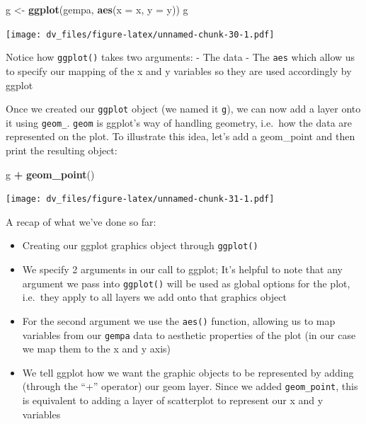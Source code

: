 \documentclass[]{article}
\newenvironment{Shaded}{\begin{snugshade}}{\end{snugshade}}
\newcommand{\DataTypeTok}[1]{\textcolor[rgb]{0.13,0.29,0.53}{#1}}
\newcommand{\KeywordTok}[1]{\textcolor[rgb]{0.13,0.29,0.53}{\textbf{#1}}}
\newcommand{\NormalTok}[1]{#1}
\newcommand{\OperatorTok}[1]{\textcolor[rgb]{0.81,0.36,0.00}{\textbf{#1}}}
\newcommand{\StringTok}[1]{\textcolor[rgb]{0.31,0.60,0.02}{#1}}
\providecommand{\tightlist}{%
  \setlength{\itemsep}{0pt}\setlength{\parskip}{0pt}}
\begin{document}
\begin{Shaded}
\begin{Highlighting}[]
\NormalTok{g <-}\StringTok{ }\KeywordTok{ggplot}\NormalTok{(gempa, }\KeywordTok{aes}\NormalTok{(}\DataTypeTok{x =}\NormalTok{ x, }\DataTypeTok{y =}\NormalTok{ y))}
\NormalTok{g}
\end{Highlighting}
\end{Shaded}

\texttt{[image: dv\_files/figure-latex/unnamed-chunk-30-1.pdf]}

Notice how \texttt{ggplot()} takes two arguments: - The data - The
\texttt{aes} which allow us to specify our mapping of the x and y
variables so they are used accordingly by ggplot

Once we created our \texttt{ggplot} object (we named it \texttt{g}), we
can now add a layer onto it using \texttt{geom\_}. \texttt{geom} is
ggplot's way of handling geometry, i.e.~how the data are represented on
the plot. To illustrate this idea, let's add a geom\_point and then
print the resulting object:

\begin{Shaded}
\begin{Highlighting}[]
\NormalTok{g }\OperatorTok{+}\StringTok{ }\KeywordTok{geom_point}\NormalTok{()}
\end{Highlighting}
\end{Shaded}

\texttt{[image: dv\_files/figure-latex/unnamed-chunk-31-1.pdf]}

A recap of what we've done so far:

\begin{itemize}
\tightlist
\item
  Creating our ggplot graphics object through \texttt{ggplot()}\\
\item
  We specify 2 arguments in our call to ggplot; It's helpful to note
  that any argument we pass into \texttt{ggplot()} will be used as
  global options for the plot, i.e.~they apply to all layers we add onto
  that graphics object\\
\item
  For the second argument we use the \texttt{aes()} function, allowing
  us to map variables from our \texttt{gempa} data to aesthetic
  properties of the plot (in our case we map them to the x and y axis)\\
\item
  We tell ggplot how we want the graphic objects to be represented by
  adding (through the ``+'' operator) our geom layer. Since we added
  \texttt{geom\_point}, this is equivalent to adding a layer of
  scatterplot to represent our x and y variables
\end{itemize}
\end{document}
